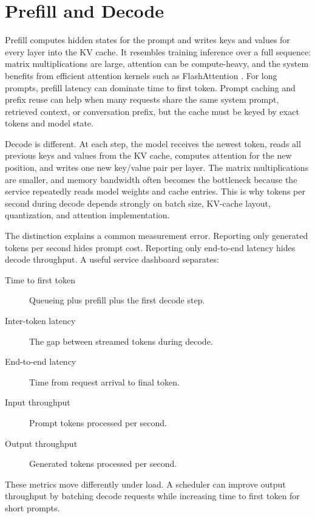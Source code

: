 \section{Prefill and Decode}
\label{sec:prefill-decode}

Prefill computes hidden states for the prompt and writes keys and values for every layer into the KV cache. It resembles training inference over a full sequence: matrix multiplications are large, attention can be compute-heavy, and the system benefits from efficient attention kernels such as FlashAttention \cite{dao2022flashattention}. For long prompts, prefill latency can dominate time to first token. Prompt caching and prefix reuse can help when many requests share the same system prompt, retrieved context, or conversation prefix, but the cache must be keyed by exact tokens and model state.

Decode is different. At each step, the model receives the newest token, reads all previous keys and values from the KV cache, computes attention for the new position, and writes one new key/value pair per layer. The matrix multiplications are smaller, and memory bandwidth often becomes the bottleneck because the service repeatedly reads model weights and cache entries. This is why tokens per second during decode depends strongly on batch size, KV-cache layout, quantization, and attention implementation.

The distinction explains a common measurement error. Reporting only generated tokens per second hides prompt cost. Reporting only end-to-end latency hides decode throughput. A useful service dashboard separates:
\begin{description}
\item[Time to first token] Queueing plus prefill plus the first decode step.
\item[Inter-token latency] The gap between streamed tokens during decode.
\item[End-to-end latency] Time from request arrival to final token.
\item[Input throughput] Prompt tokens processed per second.
\item[Output throughput] Generated tokens processed per second.
\end{description}
These metrics move differently under load. A scheduler can improve output throughput by batching decode requests while increasing time to first token for short prompts.


